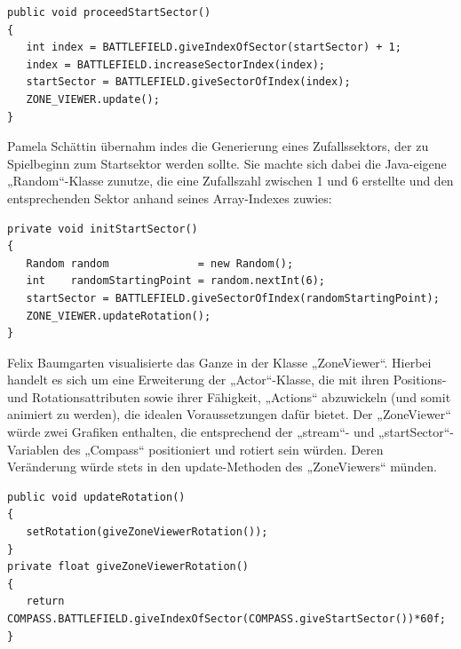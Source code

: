 \begin{lstlisting}
public void proceedStartSector()
{
   int index = BATTLEFIELD.giveIndexOfSector(startSector) + 1;
   index = BATTLEFIELD.increaseSectorIndex(index);
   startSector = BATTLEFIELD.giveSectorOfIndex(index);
   ZONE_VIEWER.update();
}
\end{lstlisting}

Pamela Schättin übernahm indes die Generierung eines Zufallssektors, der zu Spielbeginn zum Startsektor werden sollte. Sie machte sich dabei die Java-eigene „Random“-Klasse zunutze, die eine Zufallszahl zwischen 1 und 6 erstellte und den entsprechenden Sektor anhand seines Array-Indexes zuwies:

\begin{lstlisting}
private void initStartSector()
{
   Random random              = new Random();
   int    randomStartingPoint = random.nextInt(6);
   startSector = BATTLEFIELD.giveSectorOfIndex(randomStartingPoint);
   ZONE_VIEWER.updateRotation();
}
\end{lstlisting}

Felix Baumgarten visualisierte das Ganze in der Klasse „ZoneViewer“. Hierbei handelt es sich um eine Erweiterung der „Actor“-Klasse, die mit ihren Positions- und Rotationsattributen sowie ihrer Fähigkeit, „Actions“ abzuwickeln (und somit animiert zu werden), die idealen Voraussetzungen dafür bietet. Der „ZoneViewer“ würde zwei Grafiken enthalten, die entsprechend der „stream“- und „startSector“-Variablen des „Compass“ positioniert und rotiert sein würden. Deren Veränderung würde stets in den update-Methoden des „ZoneViewers“ münden.

\begin{lstlisting}
public void updateRotation()
{
   setRotation(giveZoneViewerRotation());
}
private float giveZoneViewerRotation()
{
   return COMPASS.BATTLEFIELD.giveIndexOfSector(COMPASS.giveStartSector())*60f;
}
\end{lstlisting}


